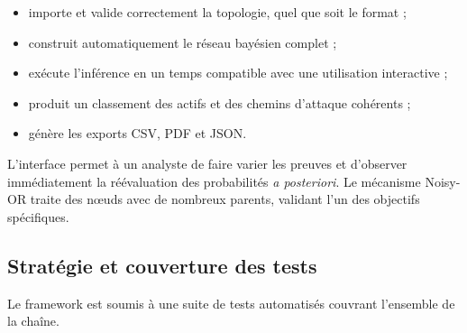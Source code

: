 \documentclass[12pt,a4paper]{article}
\newcommand{\forcereset}[1]{}
\begin{document}
\begin{itemize}[leftmargin=1.2cm, itemsep=0.2\baselineskip]
    \item importe et valide correctement la topologie, quel que soit le format ;
    \item construit automatiquement le réseau bayésien complet ;
    \item exécute l'inférence en un temps compatible avec une utilisation interactive ;
    \item produit un classement des actifs et des chemins d'attaque cohérents ;
    \item génère les exports CSV, PDF et JSON.
\end{itemize}

L'interface permet à un analyste de faire varier les preuves et d'observer immédiatement la réévaluation des probabilités \emph{a posteriori}. Le mécanisme Noisy-OR traite des nœuds avec de nombreux parents, validant l'un des objectifs spécifiques.

\subsection{Stratégie et couverture des tests}
\forcereset{5}

Le framework est soumis à une suite de tests automatisés couvrant l'ensemble de la chaîne.
\end{document}
